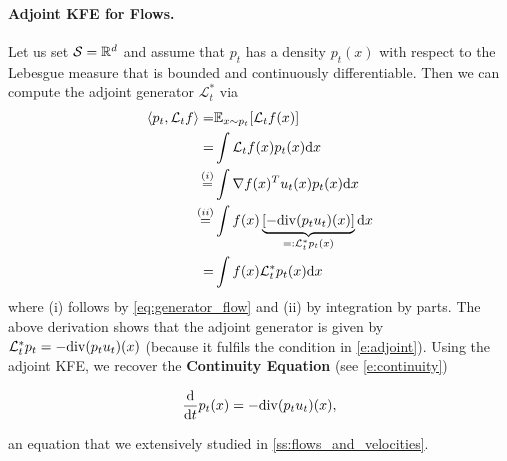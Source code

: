 \documentclass{fairmeta}
\newcommand{\highlight}[1]{{\color{metablue} \textbf{#1}}}
\numberwithin{equation}{section}
\begin{document}
\paragraph{Adjoint KFE for Flows.} Let us set ${\mathcal{S}}=\mathbb{R}^d$ and assume that $p_t$ has a density $p_t(x)$ with respect to the Lebesgue measure that is bounded and continuously differentiable. Then we can compute the adjoint generator $\mathcal{L}_t^*$ via
\begin{align}
\left \langle p_t, \mathcal{L}_t f\right \rangle
=&\mathbb{E}_{x\sim p_t}[\mathcal{L}_t f(x)]\\
=&\int \mathcal{L}_t f(x) p_t(x)\mathrm{d} x\\
\overset{(i)}{=}&\int \nabla f(x)^T u_t(x) p_t(x)\mathrm{d} x\\
\overset{(ii)}{=}&\int f(x) \underbrace{[-\mathrm{div}(p_tu_t)(x)]}_{=:\mathcal{L}_t^*p_t(x)}\mathrm{d} x\\
=&\int f(x) {\mathcal{L}}_t^*p_t(x)\mathrm{d} x
\end{align}
where (i) follows by \cref{eq:generator_flow} and (ii) by integration by parts. The above derivation shows that the adjoint generator is given by ${\mathcal{L}}_t^*p_t=-\mathrm{div}(p_tu_t)(x)$ (because it fulfils the condition in \cref{e:adjoint}). Using the adjoint KFE, we recover the \highlight{Continuity Equation} (see \cref{e:continuity})
\begin{myframe}
\begin{equation}
\frac{\mathrm{d}}{\mathrm{d} t} p_t(x) = -\mathrm{div}(p_t u_t) (x),
\end{equation}
\end{myframe}
an equation that we extensively studied  in \cref{ss:flows_and_velocities}.
\end{document}
